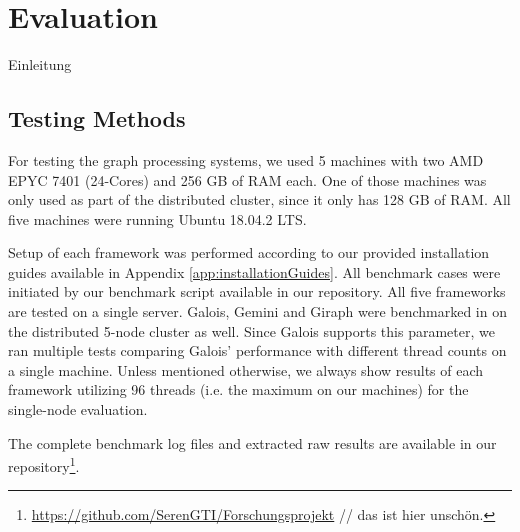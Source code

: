 
\section{Evaluation}
Einleitung

\subsection{Testing Methods}
For testing the graph processing systems, we used 5 machines with two AMD EPYC 7401 (24-Cores) and 256 GB of RAM each. One of those machines was only used as part of the distributed cluster, since it only has 128 GB of RAM.
All five machines were running Ubuntu 18.04.2 LTS.

Setup of each framework was performed according to our provided installation guides available in Appendix \ref{app:installationGuides}.
All benchmark cases were initiated by our benchmark script available in our repository. 
All five frameworks are tested on a single server. 
Galois, Gemini and Giraph were benchmarked in on the distributed 5-node cluster as well.
Since Galois supports this parameter, we ran multiple tests comparing Galois' performance with different thread counts on a single machine.
Unless mentioned otherwise, we always show results of each framework utilizing 96 threads (i.e. the maximum on our machines) for the single-node evaluation.

The complete benchmark log files and extracted raw results are available in our repository\footnote{\url{https://github.com/SerenGTI/Forschungsprojekt} // das ist hier unschön.}.

